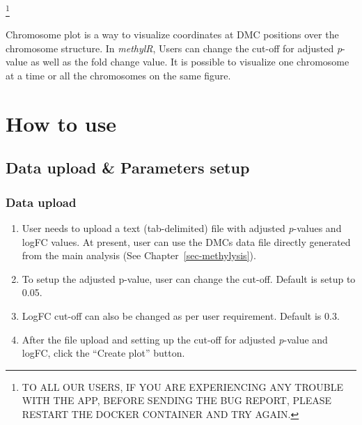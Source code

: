 \documentclass[
  a4paper,
  oneside,
  open=any]{scrreport}
\providecommand{\tightlist}{%
  \setlength{\itemsep}{0pt}\setlength{\parskip}{0pt}}\usepackage{longtable,booktabs,array}
\begin{document}
\footnote{TO ALL OUR USERS, IF YOU ARE EXPERIENCING ANY TROUBLE WITH THE
  APP, BEFORE SENDING THE BUG REPORT, PLEASE RESTART THE DOCKER
  CONTAINER AND TRY AGAIN.}

Chromosome plot is a way to visualize coordinates at DMC positions over
the chromosome structure. In \emph{methylR}, Users can change the
cut-off for adjusted \emph{p}-value as well as the fold change value. It
is possible to visualize one chromosome at a time or all the chromosomes
on the same figure.

\hypertarget{how-to-use-6}{%
\section{How to use}\label{how-to-use-6}}

\hypertarget{data-upload-parameters-setup-3}{%
\subsection{Data upload \& Parameters
setup}\label{data-upload-parameters-setup-3}}

\hypertarget{data-upload-3}{%
\subsubsection{Data upload}\label{data-upload-3}}

\begin{enumerate}
\def\labelenumi{\arabic{enumi}.}
\tightlist
\item
  User needs to upload a text (tab-delimited) file with adjusted
  \emph{p}-values and logFC values. At present, user can use the DMCs
  data file directly generated from the main analysis (See
  Chapter~\ref{sec-methylysis}).
\item
  To setup the adjusted p-value, user can change the cut-off. Default is
  setup to 0.05.
\item
  LogFC cut-off can also be changed as per user requirement. Default is
  0.3.
\item
  After the file upload and setting up the cut-off for adjusted
  \emph{p}-value and logFC, click the ``Create plot'' button.
\end{enumerate}
\end{document}
